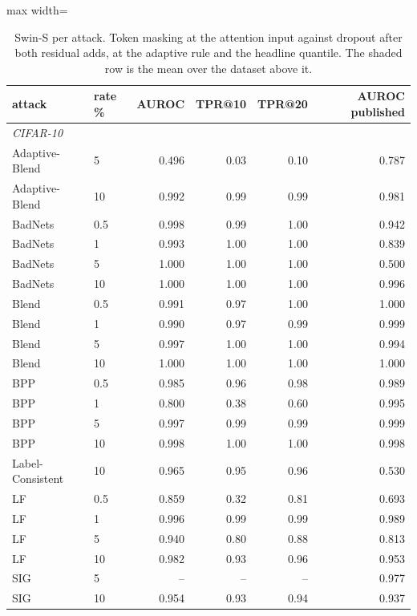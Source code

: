 \begin{table}[htbp]
\centering
\small
\caption{Swin-S per attack. Token masking at the attention input against dropout after both residual adds, at the adaptive rule and the headline quantile. The shaded row is the mean over the dataset above it.}
\label{tab:swin-attacks}
\begin{adjustbox}{max width=\linewidth}
\begin{tabular}{llrrrr}
\toprule
attack & rate \% & AUROC & TPR@10 & TPR@20 & AUROC published \\
\midrule
\multicolumn{6}{l}{\emph{CIFAR-10}} \\
Adaptive-Blend & 5 & 0.496 & 0.03 & 0.10 & 0.787 \\
Adaptive-Blend & 10 & 0.992 & 0.99 & 0.99 & 0.981 \\
BadNets & 0.5 & 0.998 & 0.99 & 1.00 & 0.942 \\
BadNets & 1 & 0.993 & 1.00 & 1.00 & 0.839 \\
BadNets & 5 & 1.000 & 1.00 & 1.00 & 0.500 \\
BadNets & 10 & 1.000 & 1.00 & 1.00 & 0.996 \\
Blend & 0.5 & 0.991 & 0.97 & 1.00 & 1.000 \\
Blend & 1 & 0.990 & 0.97 & 0.99 & 0.999 \\
Blend & 5 & 0.997 & 1.00 & 1.00 & 0.994 \\
Blend & 10 & 1.000 & 1.00 & 1.00 & 1.000 \\
BPP & 0.5 & 0.985 & 0.96 & 0.98 & 0.989 \\
BPP & 1 & 0.800 & 0.38 & 0.60 & 0.995 \\
BPP & 5 & 0.997 & 0.99 & 0.99 & 0.999 \\
BPP & 10 & 0.998 & 1.00 & 1.00 & 0.998 \\
Label-Consistent & 10 & 0.965 & 0.95 & 0.96 & 0.530 \\
LF & 0.5 & 0.859 & 0.32 & 0.81 & 0.693 \\
LF & 1 & 0.996 & 0.99 & 0.99 & 0.989 \\
LF & 5 & 0.940 & 0.80 & 0.88 & 0.813 \\
LF & 10 & 0.982 & 0.93 & 0.96 & 0.953 \\
SIG & 5 & -- & -- & -- & 0.977 \\
SIG & 10 & 0.954 & 0.93 & 0.94 & 0.937 \\

\end{tabular}
\end{adjustbox}
\end{table}
